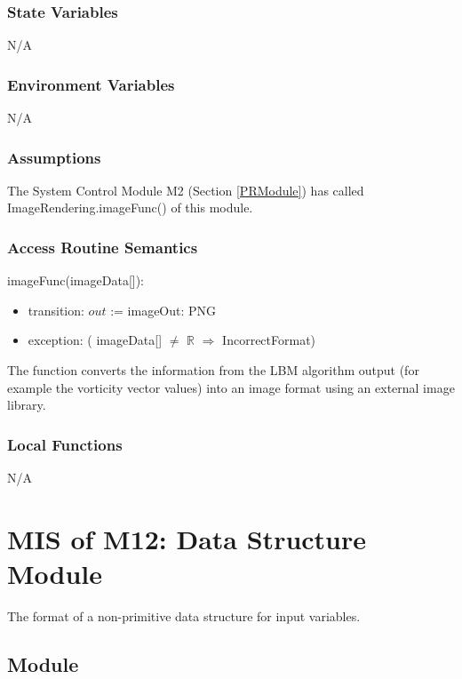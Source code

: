 \documentclass[12pt, titlepage]{article}
\begin{document}
\subsubsection{State Variables}
N/A

\subsubsection{Environment Variables}
N/A 

\subsubsection{Assumptions}

The System Control Module M2 (Section \ref{PRModule}) has called ImageRendering.imageFunc() of this module.

\subsubsection{Access Routine Semantics}

\noindent imageFunc(imageData[]):
\begin{itemize}
	\item transition: $out$ := imageOut: PNG
	\item exception: ( imageData[] $\neq$ $\mathbb{R}$ $\Rightarrow$ IncorrectFormat)
\end{itemize}

The function converts the information from the LBM algorithm output (for example the vorticity vector values) into an image format using an external image library.

\subsubsection{Local Functions}
N/A

\newpage

\section{MIS of M12: Data Structure Module} \label{DSModule} 

The format of a non-primitive data structure for input variables.

\subsection{Module}
\end{document}
